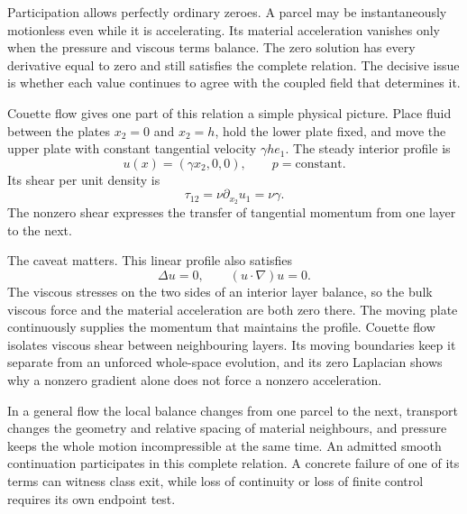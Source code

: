 Participation allows perfectly ordinary zeroes.
A parcel may be instantaneously motionless even while it is accelerating.
Its material acceleration vanishes only when the pressure and viscous terms balance.
The zero solution has every derivative equal to zero and still satisfies the complete relation.
The decisive issue is whether each value continues to agree with the coupled field that determines it.

Couette flow gives one part of this relation a simple physical picture.
Place fluid between the plates \(x_2=0\) and \(x_2=h\), hold the lower plate fixed, and move the upper plate with constant tangential velocity \(\gamma h e_1\).
The steady interior profile is
\[
  u(x)=(\gamma x_2,0,0),
  \qquad
  p=\text{constant}.
\]
Its shear per unit density is
\[
  \tau_{12}=\nu\partial_{x_2}u_1=\nu\gamma.
\]
The nonzero shear expresses the transfer of tangential momentum from one layer to the next.

The caveat matters.
This linear profile also satisfies
\[
  \Delta u=0,
  \qquad
  (u\cdot\nabla)u=0.
\]
The viscous stresses on the two sides of an interior layer balance, so the bulk viscous force and the material acceleration are both zero there.
The moving plate continuously supplies the momentum that maintains the profile.
Couette flow isolates viscous shear between neighbouring layers.
Its moving boundaries keep it separate from an unforced whole-space evolution, and its zero Laplacian shows why a nonzero gradient alone does not force a nonzero acceleration.

In a general flow the local balance changes from one parcel to the next, transport changes the geometry and relative spacing of material neighbours, and pressure keeps the whole motion incompressible at the same time.
An admitted smooth continuation participates in this complete relation.
A concrete failure of one of its terms can witness class exit, while loss of continuity or loss of finite control requires its own endpoint test.
